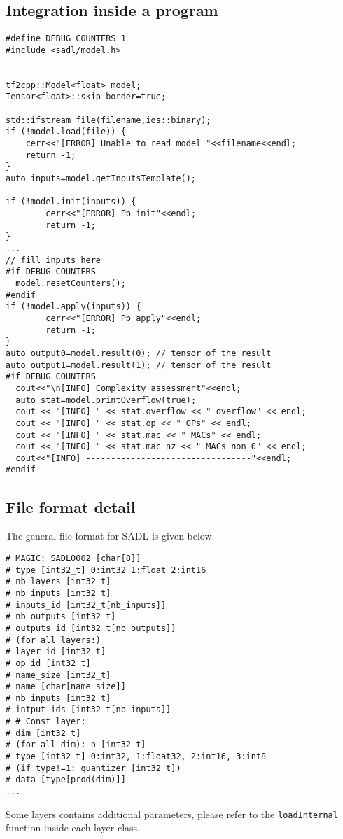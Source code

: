 \documentclass[10pt,a4paper]{article}
\begin{document}
\subsection{Integration inside a program}
\begin{lstlisting}[caption={Model inference in C++},style=codec]
#define DEBUG_COUNTERS 1 
#include <sadl/model.h>


tf2cpp::Model<float> model;
Tensor<float>::skip_border=true; 

std::ifstream file(filename,ios::binary);
if (!model.load(file)) {
    cerr<<"[ERROR] Unable to read model "<<filename<<endl;
    return -1;
}
auto inputs=model.getInputsTemplate();

if (!model.init(inputs)) {
        cerr<<"[ERROR] Pb init"<<endl;
        return -1;
}
...
// fill inputs here
#if DEBUG_COUNTERS
  model.resetCounters();
#endif
if (!model.apply(inputs)) {
        cerr<<"[ERROR] Pb apply"<<endl;
        return -1;
}
auto output0=model.result(0); // tensor of the result
auto output1=model.result(1); // tensor of the result
#if DEBUG_COUNTERS
  cout<<"\n[INFO] Complexity assessment"<<endl;
  auto stat=model.printOverflow(true);
  cout << "[INFO] " << stat.overflow << " overflow" << endl;
  cout << "[INFO] " << stat.op << " OPs" << endl;
  cout << "[INFO] " << stat.mac << " MACs" << endl;
  cout << "[INFO] " << stat.mac_nz << " MACs non 0" << endl;
  cout<<"[INFO] ---------------------------------"<<endl;
#endif

\end{lstlisting}


\subsection{File format detail}
The general file format for SADL is given below.
\begin{lstlisting}[caption={SADL format conversion},style=code]
# MAGIC: SADL0002 [char[8]] 
# type [int32_t] 0:int32 1:float 2:int16 
# nb_layers [int32_t] 
# nb_inputs [int32_t] 
# inputs_id [int32_t[nb_inputs]] 
# nb_outputs [int32_t] 
# outputs_id [int32_t[nb_outputs]] 
# (for all layers:) 
# layer_id [int32_t] 
# op_id [int32_t] 
# name_size [int32_t] 
# name [char[name_size]] 
# nb_inputs [int32_t] 
# intput_ids [int32_t[nb_inputs]] 
# # Const_layer: 
# dim [int32_t] 
# (for all dim): n [int32_t] 
# type [int32_t] 0:int32, 1:float32, 2:int16, 3:int8 
# (if type!=1: quantizer [int32_t]) 
# data [type[prod(dim)]] 
...
\end{lstlisting}
Some layers contains additional parameters, please refer to the \texttt{loadInternal} function inside each layer class.
\end{document}
